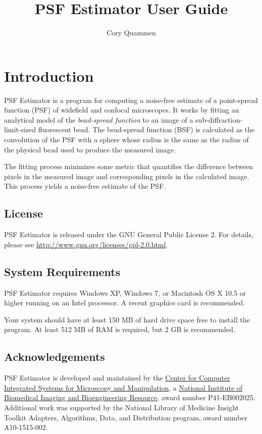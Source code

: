 \documentclass[11pt,titlepage,twoside]{article}
\title{PSF Estimator \ProgramVersion User Guide}
\author{Cory Quammen}
\begin{document}
\maketitle
\tableofcontents
\vfill

\pagebreak

\section{Introduction}

PSF Estimator is a program for computing a noise-free estimate of a point-spread function (PSF) of widefield and confocal microscopes. It works by fitting an analytical model of the \emph{bead-spread function} to an image of a sub-diffraction-limit-sized fluorescent bead. The bead-spread function (BSF) is calculated as the convolution of the PSF with a sphere whose radius is the same as the radius of the physical bead used to produce the measured image.

The fitting process minimizes some metric that quantifies the difference between pixels in the measured image and corresponding pixels in the calculated image. This process yields a noise-free estimate of the PSF.

\subsection{License}

PSF Estimator is released under the GNU General Public License 2. For details, please see \url{http://www.gnu.org/licenses/gpl-2.0.html}.

\subsection{System Requirements}

PSF Estimator \ProgramVersion requires Windows XP, Windows 7, or Macintosh OS X 10.5 or higher running on an Intel processor. A recent graphics card is recommended.

Your system should have at least 150 MB of hard drive space free to install the program. At least 512 MB of RAM is required, but 2 GB is recommended.

\subsection{Acknowledgements}

PSF Estimator \ProgramVersion is developed and maintained by the \href{http://www.cismm.org}{Center for Computer Integrated Systems for Microscopy and Manipulation}, a \href{http://www.nibib.nih.gov/}{National Institute of Biomedical Imaging and Bioengineering Resource}, award number P41-EB002025. Additional work was supported by the National Library of Medicine Insight Toolkit Adapters, Algorithms, Data, and Distribution program, award number A10-1515-002.
\end{document}
